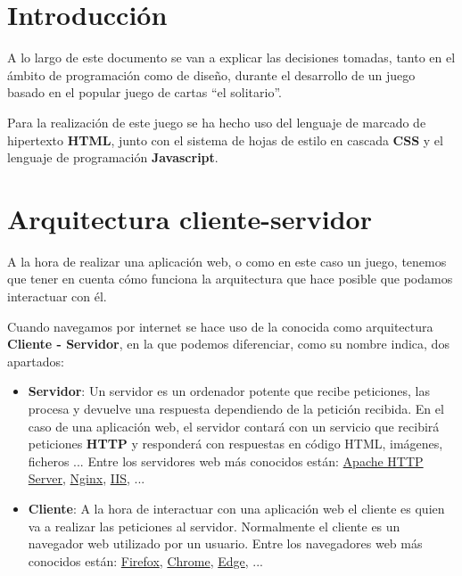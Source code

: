 \documentclass{\ClassPath/viu-tfm-template}
\begin{document}
    \graphicspath{{../../VIU_TFM_LaTeX_template/}}

    \coverpage

    \tableofcontents

\chapter{Introducción}

A lo largo de este documento se van a explicar las decisiones tomadas, tanto en el ámbito de programación como de diseño, durante el desarrollo de un juego basado en el popular juego de cartas “el solitario”.

Para la realización de este juego se ha hecho uso del lenguaje de marcado de hipertexto \textbf{HTML}, junto con el sistema de hojas de estilo en cascada \textbf{CSS} y el lenguaje de programación \textbf{Javascript}.


\chapter{Arquitectura cliente-servidor}
A la hora de realizar una aplicación web, o como en este caso un juego, tenemos que tener en cuenta cómo funciona la arquitectura que hace posible que podamos interactuar con él.

Cuando navegamos por internet se hace uso de la conocida como arquitectura \textbf{Cliente - Servidor}, en la que podemos diferenciar, como su nombre indica, dos apartados:

\begin{itemize}
    \item \textbf{Servidor}: Un servidor es un ordenador potente que recibe peticiones, las procesa y devuelve una respuesta dependiendo de la petición recibida. En el caso de una aplicación web, el servidor contará con un servicio que recibirá peticiones \textbf{HTTP} y responderá con respuestas en código HTML, imágenes, ficheros ... Entre los servidores web más conocidos están: \href{https://httpd.apache.org/}{Apache HTTP Server}, \href{https://nginx.org/}{Nginx}, \href{https://www.iis.net/}{IIS}, ...

    \item \textbf{Cliente}: A la hora de interactuar con una aplicación web el cliente es quien va a realizar las peticiones al servidor. Normalmente el cliente es un navegador web utilizado por un usuario. Entre los navegadores web más conocidos están: \href{https://www.mozilla.org/es-ES/firefox/}{Firefox}, \href{https://www.google.com/chrome/}{Chrome}, \href{https://www.microsoft.com/es-es/edge}{Edge}, ...
\end{itemize}
\end{document}
